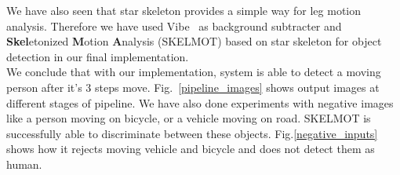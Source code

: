 We have also seen that star skeleton provides a simple way for leg
motion analysis. Therefore we have used Vibe~\cite{9} as background
subtracter and \textbf{Skel}etonized \textbf{M}otion \textbf{A}nalysis
(SKELMOT) based on star skeleton for object detection in our final
implementation.\\
\indent We conclude that with our implementation, system is able to
detect a moving person after it's 3 steps move.
Fig.~\ref{pipeline_images} shows output images at different stages of
pipeline.
\indent We have also done experiments with negative images like a person
moving on bicycle, or a vehicle moving on road. SKELMOT is successfully able
to discriminate between these objects. Fig.\ref{negative_inputs} shows
how it rejects moving vehicle and bicycle and  does not detect them as
human.

